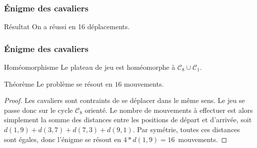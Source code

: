 \documentclass{beamer}
\begin{document}
\begin{frame}
	\frametitle{Énigme des cavaliers}
	\begin{center}
	\end{center}
	
	\pause
	
	\begin{block}{Résultat}
		On a réussi en 16 déplacements.
	\end{block}
\end{frame}

\begin{frame}
	\frametitle{Énigme des cavaliers}
	\begin{block}{Homéomorphisme}
		Le plateau de jeu est homéomorphe à $\mathcal{C}_8\cup\mathcal{C}_1$.
	\end{block}
	\begin{block}{Théorème}
		Le problème se résout en $16$ mouvements.
	\end{block}
	\begin{proof}
		Les cavaliers sont contraints de se déplacer dans le même sens. Le jeu se passe donc sur le cycle $\mathcal{C}_8$ orienté. Le nombre de mouvements à effectuer est alors simplement la somme des distances entre les positions de départ et d'arrivée, soit $d(1,9)+d(3,7)+d(7,3)+d(9,1)$. Par symétrie, toutes ces distances sont égales, donc l'énigme se résout en $4*d(1,9)=16$~mouvements.
	\end{proof}
\end{frame}
\end{document}

